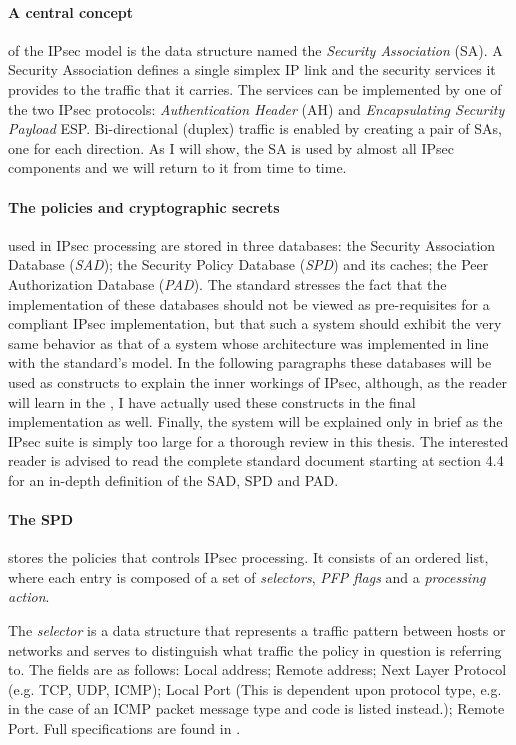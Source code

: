 \documentclass[final,a4paper,twoside,11pt,onecolumn]{report}
\begin{document}
\paragraph{A central concept} of the IPsec model is the data structure named the \emph{Security Association} (SA). A Security Association defines a single simplex IP link and the security services it provides to the traffic that it carries. The services can be implemented by one of the two IPsec protocols: \emph{Authentication Header} (AH) and \emph{Encapsulating Security Payload} ESP. Bi-directional (duplex) traffic is enabled by creating a pair of SAs, one for each direction. As I will show, the SA is used by almost all IPsec components and we will return to it from time to time.

\paragraph{The policies and cryptographic secrets} used in IPsec processing are stored in three databases: the Security Association Database (\emph{SAD}); the Security Policy Database (\emph{SPD}) and its caches; the Peer Authorization Database (\emph{PAD}). The standard stresses the fact that the implementation of these databases should not be viewed as pre-requisites for a compliant IPsec implementation, but that such a system should exhibit the very same behavior as that of a system whose architecture was implemented in line with the standard's model. In the following paragraphs these databases will be used as constructs to explain the inner workings of IPsec, although, as the reader will learn in the , I have actually used these constructs in the final implementation as well. Finally, the system will be explained only in brief as the IPsec suite is simply too large for a thorough review in this thesis. The interested reader is advised to read the complete standard document\citep{rfc4301} starting at section 4.4 for an in-depth definition of the SAD, SPD and PAD.


\paragraph{The SPD} stores the policies that controls IPsec processing. It consists of an ordered list, where each entry is composed of a set of \emph{selectors}, \emph{PFP flags} and a \emph{processing action}. 

The \emph{selector} is a data structure that represents a traffic pattern between hosts or networks and serves to distinguish what traffic the policy in question is referring to. The fields are as follows: Local address; Remote address; Next Layer Protocol (e.g. TCP, UDP, ICMP); Local Port (This is dependent upon protocol type, e.g. in the case of an ICMP packet message type and code is listed instead.); Remote Port. Full specifications are found in \citep[Section 4.4.1.1]{rfc4301}.
\end{document}
